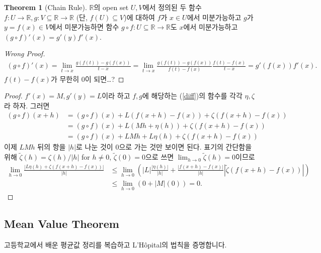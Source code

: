 \documentclass[12pt]{article}
\theoremstyle{definition}
\newtheorem{thm}{Theorem}[section]
\def\RR{\mathbb{R}}
\newcommand{\abs}[1]{\left\vert#1\right\vert}
\begin{document}
\begin{thm} [Chain Rule]
	\(\RR\)의 open set \(U, V\)에서 정의된 두 함수 \(f: U \rightarrow \RR, g: V \subseteq \RR \rightarrow \RR\) (단, \(f(U) \subseteq V\))에 대하여 \(f\)가 \(x \in U\)에서 미분가능하고 \(g\)가 \(y = f(x) \in V\)에서 미분가능하면 함수 \(g \circ f: U \subseteq \RR \rightarrow \RR\)도 \(x\)에서 미분가능하고 \((g \circ f)'(x) = g'(y)f'(x)\).
\end{thm}
\begin{proof} [Wrong Proof]
	\begin{gather*}
		(g \circ f)'(x) = \lim_{t \rightarrow x} \frac{g(f(t)) - g(f(x))}{t - x} = \lim_{t \rightarrow x} \frac{g(f(t)) - g(f(x))}{f(t) - f(x)}\frac{f(t) - f(x)}{t - x} = g'(f(x))f'(x).
	\end{gather*}
	\(f(t) - f(x)\)가 무한히 0이 되면\ldots?
\end{proof}
\begin{proof}
	\(f'(x) = M, g'(y) = L\)이라 하고 \(f, g\)에 해당하는 (\ref{diff})의 함수를 각각 \(\eta, \zeta\)라 하자. 그러면
	\begin{align*}
		(g \circ f)(x + h) &= (g \circ f)(x) + L(f(x+h) - f(x)) + \zeta(f(x+h)-f(x))\\
		&= (g \circ f)(x) + L(Mh + \eta(h)) + \zeta(f(x+h)-f(x))\\
		&= (g \circ f)(x) + LMh + L\eta(h) + \zeta(f(x+h)-f(x))
	\end{align*}
	이제 \(LMh\) 뒤의 항을 \(\abs{h}\)로 나눈 것이 0으로 가는 것만 보이면 된다. 표기의 간단함을 위해 \(\tilde{\zeta}(h) = \zeta(h) / \abs{h}\) for \(h \neq 0\), \(\tilde{\zeta}(0) = 0\)으로 쓰면 \(\lim_{h \rightarrow 0}\tilde{\zeta}(h) = 0\)이므로
	\begin{align*}
		\lim_{h \rightarrow 0} \frac{\abs{L\eta(h) + \zeta(f(x+h)-f(x))}}{\abs{h}} &\le \lim_{h \rightarrow 0} \left (\abs{L}\frac{\abs{\eta(h)}}{\abs{h}} + \frac{\abs{f(x+h) - f(x)}}{\abs{h}}\abs{\tilde{\zeta}(f(x+h)-f(x))} \right )\\
		&\le \lim_{h \rightarrow 0} \left(0 + \abs{M}(0) \right) = 0.
	\end{align*}
\end{proof}

\subsection{Mean Value Theorem} \label{sec mvt}

고등학교에서 배운 평균값 정리를 복습하고 L'H\^opital의 법칙을 증명합니다.
\end{document}

